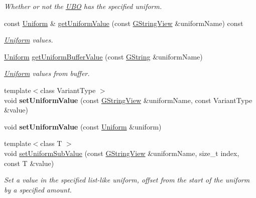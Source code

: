 \begin{Indent}
\begin{DoxyCompactItemize}
\begin{DoxyCompactList}\small\item\em Whether or not the \mbox{\hyperlink{classrev_1_1_u_b_o}{U\+BO}} has the specified uniform. \end{DoxyCompactList}\item 
\mbox{\label{classrev_1_1_u_b_o_aabbb79543513c9e7ff6bbf74b5766d6b}} 
const \mbox{\hyperlink{structrev_1_1_uniform}{Uniform}} \& \mbox{\hyperlink{classrev_1_1_u_b_o_aabbb79543513c9e7ff6bbf74b5766d6b}{get\+Uniform\+Value}} (const \mbox{\hyperlink{classrev_1_1_g_string_view}{G\+String\+View}} \&uniform\+Name) const
\begin{DoxyCompactList}\small\item\em \mbox{\hyperlink{structrev_1_1_uniform}{Uniform}} values. \end{DoxyCompactList}\item 
\mbox{\label{classrev_1_1_u_b_o_acc3da5616ef75a0b5ee6dc23033c5c41}} 
\mbox{\hyperlink{structrev_1_1_uniform}{Uniform}} \mbox{\hyperlink{classrev_1_1_u_b_o_acc3da5616ef75a0b5ee6dc23033c5c41}{get\+Uniform\+Buffer\+Value}} (const \mbox{\hyperlink{classrev_1_1_g_string}{G\+String}} \&uniform\+Name)
\begin{DoxyCompactList}\small\item\em \mbox{\hyperlink{structrev_1_1_uniform}{Uniform}} values from buffer. \end{DoxyCompactList}\item 
\mbox{\label{classrev_1_1_u_b_o_a951f7d8d9bb46f8cfb644786d327af79}} 
{\footnotesize template$<$class Variant\+Type $>$ }\\void {\bfseries set\+Uniform\+Value} (const \mbox{\hyperlink{classrev_1_1_g_string_view}{G\+String\+View}} \&uniform\+Name, const Variant\+Type \&value)
\item 
\mbox{\label{classrev_1_1_u_b_o_a39d963f745360efc566b99507bb50fde}} 
void {\bfseries set\+Uniform\+Value} (const \mbox{\hyperlink{structrev_1_1_uniform}{Uniform}} \&uniform)
\item 
\mbox{\label{classrev_1_1_u_b_o_a4b64e0f73a9057910d4a0e3ee4f0d1b3}} 
{\footnotesize template$<$class T $>$ }\\void \mbox{\hyperlink{classrev_1_1_u_b_o_a4b64e0f73a9057910d4a0e3ee4f0d1b3}{set\+Uniform\+Sub\+Value}} (const \mbox{\hyperlink{classrev_1_1_g_string_view}{G\+String\+View}} \&uniform\+Name, size\+\_\+t index, const T \&value)
\begin{DoxyCompactList}\small\item\em Set a value in the specified list-\/like uniform, offset from the start of the uniform by a specified amount. \end{DoxyCompactList}\end{DoxyCompactItemize}
\end{Indent}
